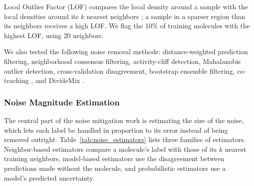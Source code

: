 Local Outlier Factor (LOF) compares the local density around a sample with the local densities around its $k$ nearest neighbors \citep{Breunig2000}; a sample in a sparser region than its neighbors receives a high LOF. We flag the 10\% of training molecules with the highest LOF, using 20 neighbors. %

We also tested the following noise removal methods: distance-weighted prediction filtering, neighborhood consensus filtering, activity-cliff detection, Mahalanobis outlier detection, cross-validation disagreement, bootstrap ensemble filtering, co-teaching \citep{Han2018}, and DivideMix \citep{li2020dividemix}.

\subsubsection{Noise Magnitude Estimation}

The central part of the noise mitigation work is estimating the size of the noise, which lets each label be handled in proportion to its error instead of being removed outright. Table~\ref{tab:noise_estimators} lists three families of estimators. Neighbor-based estimators compare a molecule's label with those of its $k$ nearest training neighbors, model-based estimators use the disagreement between predictions made without the molecule, and probabilistic estimators use a model's predicted uncertainty.

